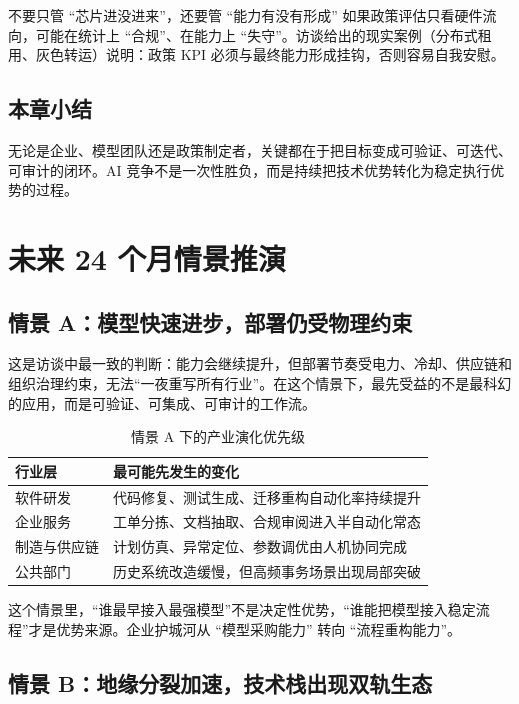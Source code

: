 \documentclass[a4paper]{article}
\begin{document}
\begin{warningbox}{不要只管 ``芯片进没进来''，还要管 ``能力有没有形成''}
如果政策评估只看硬件流向，可能在统计上 ``合规''、在能力上 ``失守''。访谈给出的现实案例（分布式租用、灰色转运）说明：政策 KPI 必须与最终能力形成挂钩，否则容易自我安慰。
\end{warningbox}

\subsection{本章小结}

无论是企业、模型团队还是政策制定者，关键都在于把目标变成可验证、可迭代、可审计的闭环。AI 竞争不是一次性胜负，而是持续把技术优势转化为稳定执行优势的过程。

\section{未来 24 个月情景推演}

\subsection{情景 A：模型快速进步，部署仍受物理约束}

这是访谈中最一致的判断：能力会继续提升，但部署节奏受电力、冷却、供应链和组织治理约束，无法``一夜重写所有行业''。在这个情景下，最先受益的不是最科幻的应用，而是可验证、可集成、可审计的工作流。

\begin{table}[H]
\centering
\begin{tabular}{lp{8.8cm}}
\toprule
\textbf{行业层} & \textbf{最可能先发生的变化} \\
\midrule
软件研发 & 代码修复、测试生成、迁移重构自动化率持续提升 \\
企业服务 & 工单分拣、文档抽取、合规审阅进入半自动化常态 \\
制造与供应链 & 计划仿真、异常定位、参数调优由人机协同完成 \\
公共部门 & 历史系统改造缓慢，但高频事务场景出现局部突破 \\
\bottomrule
\end{tabular}
\caption{情景 A 下的产业演化优先级}
\end{table}

这个情景里，``谁最早接入最强模型''不是决定性优势，``谁能把模型接入稳定流程''才是优势来源。企业护城河从 ``模型采购能力'' 转向 ``流程重构能力''。

\subsection{情景 B：地缘分裂加速，技术栈出现双轨生态}
\end{document}
